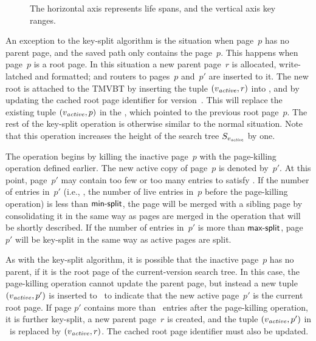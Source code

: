 \begin{figure}[!htb]
\begin{center}
  
  {The horizontal axis represents life spans, and the vertical axis key
  ranges.}
  \label{fig:split-active} 
\end{center}
\end{figure}

An exception to the key-split algorithm is the situation when page~$p$
has no parent page, and the saved path only contains the page~$p$. 
This happens when page~$p$ is a root page.
In this situation a new parent page~$r$ is allocated, write-latched and
formatted; and routers to pages~$p$ and~$p'$ are inserted to it. 
The new root is attached to the TMVBT by inserting the tuple $(\smash{v_{\text{\textit{active}}}}, r)$
into \rootstar, and by updating the cached root page identifier for
version~\actver.
This will replace the existing tuple $(\smash{v_{\text{\textit{active}}}}, p)$ in the \rootstar,
which pointed to the previous root page~$p$.
The rest of the key-split operation is otherwise similar to the normal
situation.
Note that this operation increases the height of the search tree
$S_{\smash{v_{\text{\textit{active}}}}}$ by one.

The  operation begins by killing the inactive page~$p$
with the page-killing operation defined earlier. 
The new active copy of page~$p$ is denoted by~$p'$.
At this point, page~$p'$ may contain too few or too many entries to satisfy
.
If the number of entries in~$p'$ (i.e., , the number of live
entries in~$p$ before the page-killing operation) is less than $\text{\textsf{min-split}}$,
the page will be merged with a sibling page by consolidating it in the same
way as pages are merged in the  operation that will be
shortly described. 
If the number of entries in~$p'$ is more than $\text{\textsf{max-split}}$, page~$p'$ will
be key-split in the same way as active pages are split. 

As with the key-split algorithm, it is possible that the inactive page~$p$
has no parent, if it is the root page of the current-version search tree.
In this case, the page-killing operation cannot update the parent page, but
instead a new tuple $(\smash{v_{\text{\textit{active}}}}, p')$ is inserted to \rootstar\ to indicate
that the new active page~$p'$ is the current root page.
If page $p'$ contains more than \maxsplit\ entries after the page-killing
operation, it is further key-split, a new parent page~$r$ is created, 
and the tuple $(\smash{v_{\text{\textit{active}}}}, p')$ in \rootstar\ is replaced by $(\smash{v_{\text{\textit{active}}}}, r)$.
The cached root page identifier must also be updated.

